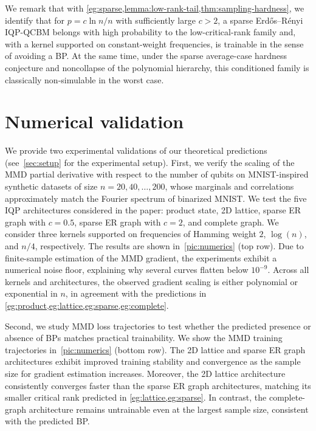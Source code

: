 \documentclass{article}
\theoremstyle{plain}
\theoremstyle{definition}
\theoremstyle{remark}
\begin{document}
We remark that with \cref{eg:sparse,lemma:low-rank-tail,thm:sampling-hardness}, we identify that for $p=c\ln n/n$ with sufficiently large $c>2$, a sparse Erd\H{o}s--R\'enyi IQP-QCBM belongs with high probability to the low-critical-rank family and, with a kernel supported on constant-weight frequencies, is trainable in the sense of avoiding a BP. At the same time, under the sparse average-case hardness conjecture and noncollapse of the polynomial hierarchy, this conditioned family is classically non-simulable in the worst case.

\section{Numerical validation} \label{sec:numerical-validation}
We provide two experimental validations of our theoretical predictions (see~\cref{sec:setup} for the experimental setup). First, we verify the scaling of the MMD partial derivative with respect to the number of qubits on MNIST-inspired synthetic datasets of size $n=20,40,\ldots,200$, whose marginals and correlations approximately match the Fourier spectrum of binarized MNIST. We test the five IQP architectures considered in the paper: product state, 2D lattice, sparse ER graph with $c=0.5$, sparse ER graph with $c=2$, and complete graph. We consider three kernels supported on frequencies of Hamming weight $2$, $\log(n)$, and $n/4$, respectively. The results are shown in~\cref{pic:numerics} (top row). Due to finite-sample estimation of the MMD gradient, the experiments exhibit a numerical noise floor, explaining why several curves flatten below $10^{-9}$. Across all kernels and architectures, the observed gradient scaling is either polynomial or exponential in $n$, in agreement with the predictions in \cref{eg:product,eg:lattice,eg:sparse,eg:complete}.

Second, we study MMD loss trajectories to test whether the predicted presence or absence of BPs matches practical trainability. We show the MMD training trajectories in~\cref{pic:numerics} (bottom row). The 2D lattice and sparse ER graph architectures exhibit improved training stability and convergence as the sample size for gradient estimation increases. Moreover, the 2D lattice architecture consistently converges faster than the sparse ER graph architectures, matching its smaller critical rank predicted in \cref{eg:lattice,eg:sparse}. In contrast, the complete-graph architecture remains untrainable even at the largest sample size, consistent with the predicted BP.
\end{document}
